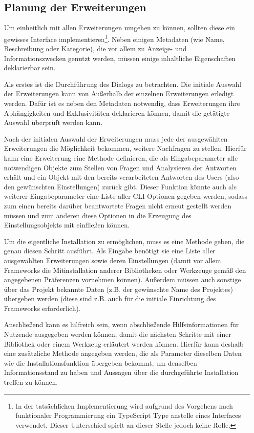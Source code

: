 \subsection{Planung der Erweiterungen}
Um einheitlich mit allen Erweiterungen umgehen zu können, sollten diese ein gewisses Interface implementieren\footnote{In der tatsächlichen Implementierung wird aufgrund des Vorgehens nach funktionaler Programmierung ein TypeScript Type anstelle eines Interfaces verwendet. Dieser Unterschied spielt an dieser Stelle jedoch keine Rolle.}. Neben einigen Metadaten (wie Name, Beschreibung oder Kategorie), die vor allem zu Anzeige- und Informationszwecken genutzt werden, müssen einige inhaltliche Eigenschaften deklarierbar sein.

Als erstes ist die Durchführung des Dialogs zu betrachten. Die initiale Auswahl der Erweiterungen kann von Außerhalb der einzelnen Erweiterungen erledigt werden. Dafür ist es neben den Metadaten notwendig, dass Erweiterungen ihre Abhängigkeiten und Exklusivitäten deklarieren können, damit die getätigte Auswahl überprüft werden kann.

Nach der initialen Auswahl der Erweiterungen muss jede der ausgewählten Erweiterungen die Möglichkeit bekommen, weitere Nachfragen zu stellen. Hierfür kann eine Erweiterung eine Methode definieren, die als Eingabeparameter alle notwendigen Objekte zum Stellen von Fragen und Analysieren der Antworten erhält und ein Objekt mit den bereits verarbeiteten Antworten des Users (also den gewünschten Einstellungen) zurück gibt. Dieser Funktion könnte auch als weiterer Eingabeparameter eine Liste aller \gls{CLI}-Optionen gegeben werden, sodass zum einen bereits darüber beantwortete Fragen nicht erneut gestellt werden müssen und zum anderen diese Optionen in die Erzeugung des Einstellungsobjekts mit einfließen können.

Um die eigentliche Installation zu ermöglichen, muss es eine Methode geben, die genau diesen Schritt ausführt. Als Eingabe benötigt sie eine Liste aller ausgewählten Erweiterungen sowie deren Einstellungen (damit vor allem Frameworks die Mitinstallation anderer Bibliotheken oder Werkzeuge gemäß den angegebenen Präferenzen vornehmen können). Außerdem müssen auch sonstige über das Projekt bekannte Daten (z.B. der gewünschte Name des Projektes) übergeben werden (diese sind z.B. auch für die initiale Einrichtung des Frameworks erforderlich).

Anschließend kann es hilfreich sein, wenn abschließende Hilfsinformationen für Nutzende ausgegeben werden können, damit die nächsten Schritte mit einer Bibliothek oder einem Werkzeug erläutert werden können. Hierfür kann deshalb eine zusätzliche Methode angegeben werden, die als Parameter dieselben Daten wie die Installationsfunktion übergeben bekommt, um denselben Informationsstand zu haben und Aussagen über die durchgeführte Installation treffen zu können.

